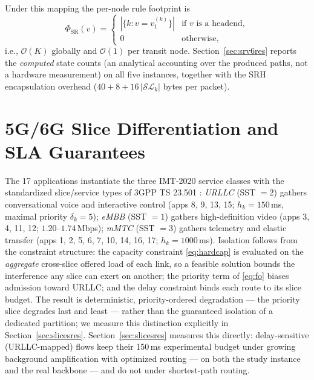 \documentclass[journal]{IEEEtran}
\begin{document}
Under this mapping the per-node rule footprint is
\begin{equation}
\Phi_{\mathrm{SR}}(v)=\begin{cases}
|\{k: v=v^{(k)}_1\}| & \text{if $v$ is a headend},\\
0 & \text{otherwise},
\end{cases}
\label{eq:srstate}
\end{equation}
i.e., $\mathcal{O}(K)$ globally and $\mathcal{O}(1)$ per transit node.
Section~\ref{sec:srv6res} reports the \emph{computed} state counts (an
analytical accounting over the produced paths, not a hardware measurement)
on all five instances, together with the SRH encapsulation overhead
($40+8+16\,|\mathcal{SL}_k|$ bytes per packet).

\section{5G/6G Slice Differentiation and SLA Guarantees}
\label{sec:slices}
The 17 applications instantiate the three IMT-2020 service classes
\cite{itu-m2083} with the standardized slice/service types of 3GPP TS
23.501 \cite{3gpp-ts23501}: \emph{URLLC} (SST $=2$) gathers conversational
voice and interactive control (apps 8, 9, 13, 15; $h_k=150$\,ms, maximal
priority $\delta_k=5$); \emph{eMBB} (SST $=1$) gathers high-definition video
(apps 3, 4, 11, 12; $1.20$--$1.74$\,Mbps); \emph{mMTC} (SST $=3$) gathers
telemetry and elastic transfer (apps 1, 2, 5, 6, 7, 10, 14, 16, 17;
$h_k=1000$\,ms). Isolation follows from the constraint structure: the
capacity constraint \eqref{eq:hardcap} is evaluated on the \emph{aggregate}
cross-slice offered load of each link, so a feasible solution bounds the
interference any slice can exert on another; the priority term of
\eqref{eq:fo} biases admission toward URLLC; and the delay constraint binds
each route to its slice budget. The result is deterministic, priority-ordered
degradation --- the priority slice degrades last and least --- rather than
the guaranteed isolation of a dedicated partition; we measure this
distinction explicitly in Section~\ref{sec:slicesres}. Section~\ref{sec:slicesres} measures this directly: delay-sensitive
(URLLC-mapped) flows keep their 150\,ms experimental budget under growing
background amplification with optimized routing --- on both the study
instance and the real backbone --- and do not under shortest-path routing.

\end{document}
